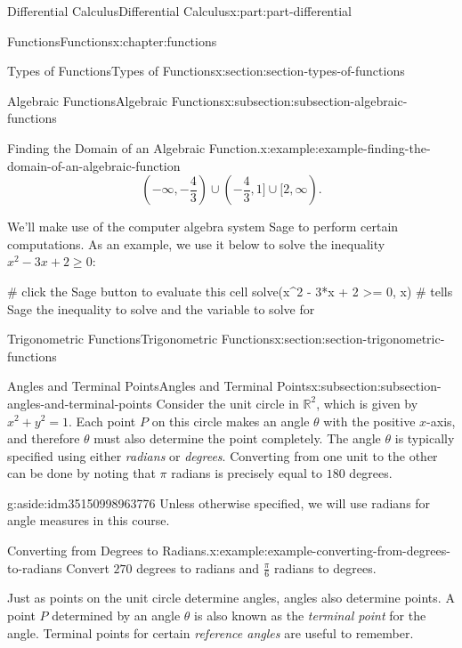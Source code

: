 \documentclass[twoside,10pt,]{book}
\numberwithin{equation}{part}
\newcommand{\RR}{\mathbb{R}}
\begin{document}
\begin{partptx}{Differential Calculus}{}{Differential Calculus}{}{}{x:part:part-differential}
\begin{chapterptx}{Functions}{}{Functions}{}{}{x:chapter:functions}
\begin{sectionptx}{Types of Functions}{}{Types of Functions}{}{}{x:section:section-types-of-functions}
\begin{subsectionptx}{Algebraic Functions}{}{Algebraic Functions}{}{}{x:subsection:subsection-algebraic-functions}
\begin{example}{Finding the Domain of an Algebraic Function.}{x:example:example-finding-the-domain-of-an-algebraic-function}
\begin{equation*}
(-\infty, -\frac{4}{3})\cup (-\frac{4}{3}, 1]\cup[2,\infty)\text{.}
\end{equation*}
%
\end{example}
We'll make use of the computer algebra system Sage to perform certain computations. As an example, we use it below to solve the inequality \(x^{2} - 3x + 2 \geq 0\):%
\begin{sageinput}
# click the Sage button to evaluate this cell
solve(x^2 - 3*x + 2 >= 0, x)    # tells Sage the inequality to solve and the variable to solve for
\end{sageinput}
\end{subsectionptx}
\end{sectionptx}
%
%
\typeout{************************************************}
\typeout{************************************************}
%
\begin{sectionptx}{Trigonometric Functions}{}{Trigonometric Functions}{}{}{x:section:section-trigonometric-functions}
%
%
\typeout{************************************************}
\typeout{************************************************}
%
\begin{subsectionptx}{Angles and Terminal Points}{}{Angles and Terminal Points}{}{}{x:subsection:subsection-angles-and-terminal-points}
Consider the unit circle in \(\RR^2\), which is given by \(x^2 + y^2 = 1\). Each point \(P\) on this circle makes an angle \(\theta\) with the positive \(x\)-axis, and therefore \(\theta\) must also determine the point completely. The angle \(\theta\) is typically specified using either \emph{radians} or \emph{degrees}. Converting from one unit to the other can be done by noting that \(\pi\) radians is precisely equal to \(180\) degrees. \begin{aside}{}{g:aside:idm35150998963776}%
Unless otherwise specified, we will use radians for angle measures in this course.%
\end{aside}
%
\begin{example}{Converting from Degrees to Radians.}{x:example:example-converting-from-degrees-to-radians}%
Convert \(270\) degrees to radians and \(\frac{\pi}{6}\) radians to degrees.%
\end{example}
Just as points on the unit circle determine angles, angles also determine points. A point \(P\) determined by an angle \(\theta\) is also known as the \emph{terminal point} for the angle. Terminal points for certain \emph{reference angles} are useful to remember.%

\end{subsectionptx}
\end{sectionptx}
\end{chapterptx}
\end{partptx}
\end{document}
